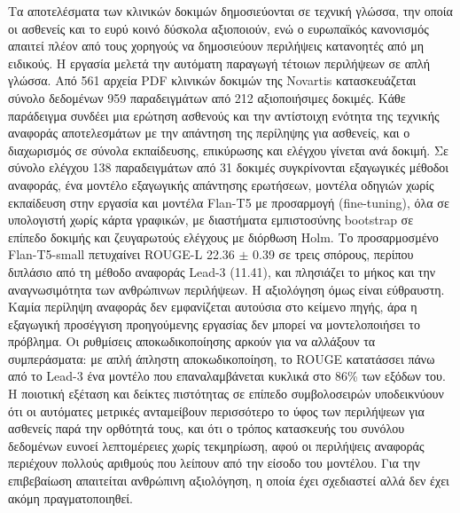 \documentclass[
12pt, %
english, %
onehalfspacing, %
headsepline, %
]{MastersDoctoralThesis} %
\begin{document}
Τα αποτελέσματα των κλινικών δοκιμών δημοσιεύονται σε τεχνική γλώσσα, την οποία οι ασθενείς και το ευρύ κοινό δύσκολα αξιοποιούν, ενώ ο ευρωπαϊκός κανονισμός απαιτεί πλέον από τους χορηγούς να δημοσιεύουν περιλήψεις κατανοητές από μη ειδικούς. Η εργασία μελετά την αυτόματη παραγωγή τέτοιων περιλήψεων σε απλή γλώσσα. Από 561 αρχεία \foreignlanguage{english}{PDF} κλινικών δοκιμών της \foreignlanguage{english}{Novartis} κατασκευάζεται σύνολο δεδομένων 959 παραδειγμάτων από 212 αξιοποιήσιμες δοκιμές. Κάθε παράδειγμα συνδέει μια ερώτηση ασθενούς και την αντίστοιχη ενότητα της τεχνικής αναφοράς αποτελεσμάτων με την απάντηση της περίληψης για ασθενείς, και ο διαχωρισμός σε σύνολα εκπαίδευσης, επικύρωσης και ελέγχου γίνεται ανά δοκιμή. Σε σύνολο ελέγχου 138 παραδειγμάτων από 31 δοκιμές συγκρίνονται εξαγωγικές μέθοδοι αναφοράς, ένα μοντέλο εξαγωγικής απάντησης ερωτήσεων, μοντέλα οδηγιών χωρίς εκπαίδευση στην εργασία και μοντέλα \foreignlanguage{english}{Flan-T5} με προσαρμογή (\foreignlanguage{english}{fine-tuning}), όλα σε υπολογιστή χωρίς κάρτα γραφικών, με διαστήματα εμπιστοσύνης \foreignlanguage{english}{bootstrap} σε επίπεδο δοκιμής και ζευγαρωτούς ελέγχους με διόρθωση \foreignlanguage{english}{Holm}. Το προσαρμοσμένο \foreignlanguage{english}{Flan-T5-small} πετυχαίνει \foreignlanguage{english}{ROUGE-L} 22.36 $\pm$ 0.39 σε τρεις σπόρους, περίπου διπλάσιο από τη μέθοδο αναφοράς \foreignlanguage{english}{Lead-3} (11.41), και πλησιάζει το μήκος και την αναγνωσιμότητα των ανθρώπινων περιλήψεων. Η αξιολόγηση όμως είναι εύθραυστη. Καμία περίληψη αναφοράς δεν εμφανίζεται αυτούσια στο κείμενο πηγής, άρα η εξαγωγική προσέγγιση προηγούμενης εργασίας δεν μπορεί να μοντελοποιήσει το πρόβλημα. Οι ρυθμίσεις αποκωδικοποίησης αρκούν για να αλλάξουν τα συμπεράσματα: με απλή άπληστη αποκωδικοποίηση, το \foreignlanguage{english}{ROUGE} κατατάσσει πάνω από το \foreignlanguage{english}{Lead-3} ένα μοντέλο που επαναλαμβάνεται κυκλικά στο 86\% των εξόδων του. Η ποιοτική εξέταση και δείκτες πιστότητας σε επίπεδο συμβολοσειρών υποδεικνύουν ότι οι αυτόματες μετρικές ανταμείβουν περισσότερο το ύφος των περιλήψεων για ασθενείς παρά την ορθότητά τους, και ότι ο τρόπος κατασκευής του συνόλου δεδομένων ευνοεί λεπτομέρειες χωρίς τεκμηρίωση, αφού οι περιλήψεις αναφοράς περιέχουν πολλούς αριθμούς που λείπουν από την είσοδο του μοντέλου. Για την επιβεβαίωση απαιτείται ανθρώπινη αξιολόγηση, η οποία έχει σχεδιαστεί αλλά δεν έχει ακόμη πραγματοποιηθεί.



\hypersetup{hidelinks}
\tableofcontents %
\end{document}
